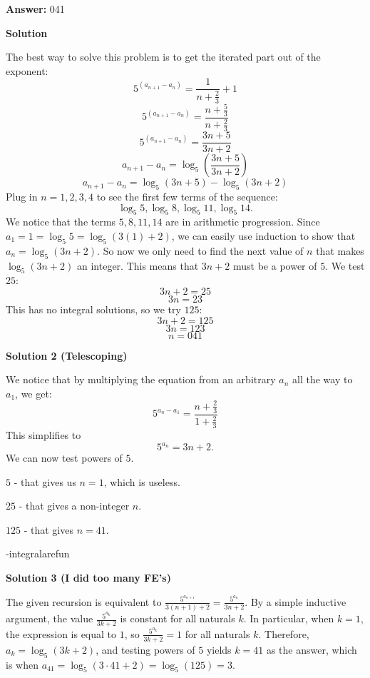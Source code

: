\begin{enumerate}
 
 \textbf{Answer: }041



\textbf{Solution}

The best way to solve this problem is to get the iterated part out of the exponent:
 \[5^{(a_{n + 1} - a_n)} = \frac {1}{n + \frac {2}{3}} + 1\]
 \[5^{(a_{n + 1} - a_n)} = \frac {n + \frac {5}{3}}{n + \frac {2}{3}}\]
 \[5^{(a_{n + 1} - a_n)} = \frac {3n + 5}{3n + 2}\]
 \[a_{n + 1} - a_n = \log_5{\left(\frac {3n + 5}{3n + 2}\right)}\]
 \[a_{n + 1} - a_n = \log_5{(3n + 5)} - \log_5{(3n + 2)}\]Plug in $n = 1, 2, 3, 4$ to see the first few terms of the sequence: 
 \[\log_5{5},\log_5{8}, \log_5{11}, \log_5{14}.\] We notice that the terms  $5, 8, 11, 14$ are in arithmetic progression. Since $a_1 = 1 = \log_5{5} = \log_5{(3(1) + 2)}$, we can easily use induction to show that $a_n = \log_5{(3n + 2)}$. So now we only need to find the next value of $n$ that makes $\log_5{(3n + 2)}$ an integer. This means that $3n + 2$ must be a power of $5$. We test $25$: 
 \[3n + 2 = 25\] 
 \[3n = 23\] This has no integral solutions, so we try $125$: 
 \[3n + 2 = 125\] 
 \[3n = 123\] 
 \[n = \boxed{041}\]




\textbf{Solution 2 (Telescoping)}

We notice that by multiplying the equation from an arbitrary $a_n$ all the way to $a_1$, we get:
 \[5^{a_n-a_1}=\dfrac{n+\frac23}{1+\frac23}\]This simplifies to
 \[5^{a_n}=3n+2.\]We can now test powers of $5$.

 $5$ - that gives us $n=1$, which is useless.

 $25$ - that gives a non-integer $n$.

 $125$ - that gives $n=\boxed{41}$.

 -integralarefun

 



\textbf{Solution 3 (I did too many FE's)}

The given recursion is equivalent to $\frac{5^{a_{n+1}}}{3(n+1)+2}=\frac{5^{a_n}}{3n+2}$. By a simple inductive argument, the value $\frac{5^{a_k}}{3k+2}$ is constant for all naturals $k$. In particular, when $k=1$, the expression is equal to $1$, so $\frac{5^{a_k}}{3k+2}=1$ for all naturals $k$. Therefore, $a_k=\log_5(3k+2)$, and testing powers of $5$ yields $k=\boxed{41}$ as the answer, which is when $a_{41}=\log_5(3\cdot41+2)=\log_5(125)=3$.

 




\end{enumerate}
